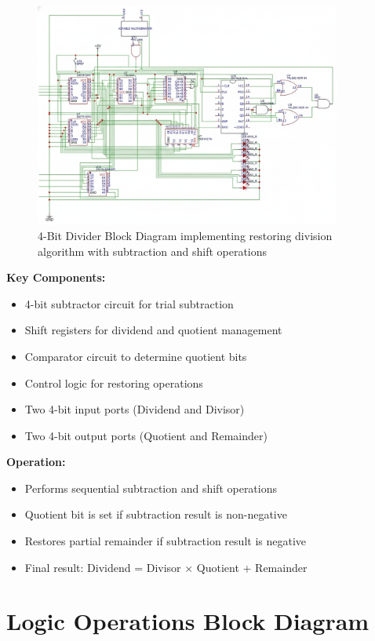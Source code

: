 \begin{figure}[h]
    \centering
    \includegraphics[width=0.9\textwidth]{divider}
    \caption{4-Bit Divider Block Diagram implementing restoring division algorithm with subtraction and shift operations}
    \label{fig:divider}
\end{figure}

\textbf{Key Components:}
\begin{itemize}
    \item 4-bit subtractor circuit for trial subtraction
    \item Shift registers for dividend and quotient management
    \item Comparator circuit to determine quotient bits
    \item Control logic for restoring operations
    \item Two 4-bit input ports (Dividend and Divisor)
    \item Two 4-bit output ports (Quotient and Remainder)
\end{itemize}

\textbf{Operation:}
\begin{itemize}
    \item Performs sequential subtraction and shift operations
    \item Quotient bit is set if subtraction result is non-negative
    \item Restores partial remainder if subtraction result is negative
    \item Final result: Dividend = Divisor × Quotient + Remainder
\end{itemize}

\section{Logic Operations Block Diagram}


